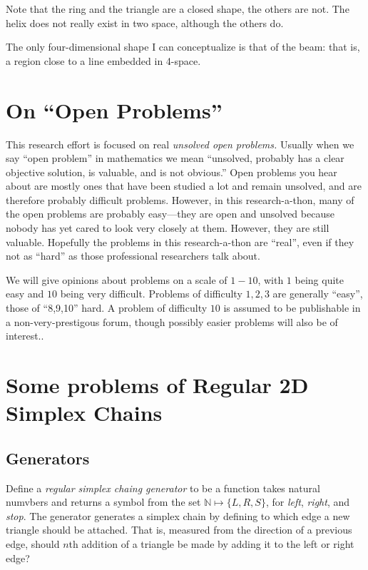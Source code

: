 \documentclass[11pt]{article}
\begin{document}
Note that the ring and the triangle are a closed shape, the others are not.
The helix does not really exist in two space, although the others do.

The only four-dimensional shape I can conceptualize is that of the
beam: that is, a region close to a line embedded in 4-space.

\section{On ``Open Problems''}

This research effort is focused on real {\em unsolved open problems.}
Usually when we say ``open problem'' in mathematics we mean ``unsolved, probably has a clear objective solution, is valuable,
and is not obvious.''
Open problems you hear about are mostly ones that have been studied a lot and remain unsolved, and are therefore probably difficult problems.
However, in this research-a-thon, many of the open problems are probably easy---they are open and unsolved because nobody has yet
cared to look very closely at them.  However, they are still valuable. Hopefully the problems in this research-a-thon are ``real'', even if they
not as ``hard'' as those professional researchers talk about.

We will give opinions about problems on a scale of $1-10$, with $1$ being quite easy and $10$ being very difficult. Problems of difficulty $1,2,3$
are generally ``easy'', those of ``8,9,10'' hard.  A problem of difficulty $10$ is assumed to be publishable in a non-very-prestigous forum, though
possibly easier problems will also be of interest..

\section{Some problems of Regular 2D Simplex Chains}

\subsection{Generators}

Define a {\em regular simplex chaing generator} to be a function takes natural numvbers and returns a symbol from the set $\mathbb{N} \mapsto \{L,R,S\}$,
  for {\em left}, {\em right}, and {\em stop}. The generator generates a simplex chain by defining to which edge a new triangle should
  be attached. That is, measured from the direction of a previous edge, should $n$th addition of a triangle be made by adding it
  to the left or right edge?
\end{document}
